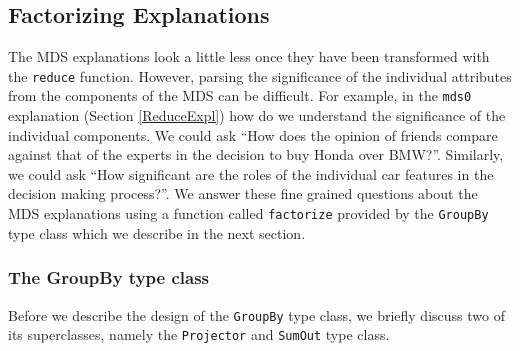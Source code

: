 \documentclass{jfp}
\newcommand{\prog}[1]{\texttt{#1}}
\begin{document}
\subsection{Factorizing Explanations}
The MDS explanations look a little less once they have been transformed with the \prog{reduce} function. However, parsing the significance of the individual attributes from the components of the MDS can be difficult. For example, in the \prog{mds0} explanation (Section \ref{ReduceExpl}) how do we understand the significance of the individual components. We could ask ``How does the opinion of friends compare against that of the experts in the decision to buy Honda over BMW?''. Similarly, we could ask ``How significant are the roles of the individual car features in the decision making process?''. We answer these fine grained questions about the MDS explanations using a function called \prog{factorize} provided by the \prog{GroupBy} type class which we describe in the next section. 

\subsubsection {The GroupBy type class}
Before we describe the design of the \prog{GroupBy} type class, we briefly discuss two of its superclasses, namely the \prog{Projector} and \prog{SumOut} type class. 
\end{document}
